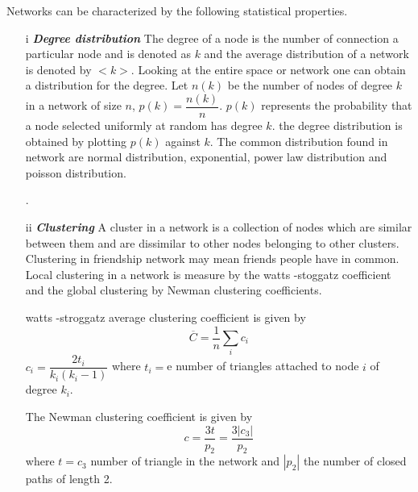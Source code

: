  Networks can be characterized by the following statistical properties.
 \begin{itemize}
 \item[i] \textit{\textbf{Degree distribution}}
   The degree of a node is the number of connection a particular node  and is denoted as $k$  and the average distribution of a network is denoted by $<k>$.
   Looking at the entire space or network one can obtain a distribution for the degree. Let $n(k)$ be the number of nodes of degree $k$  in a network of size $n$, $p(k) = \dfrac{n(k)}{n}$. $p(k)$ represents the probability that a node selected uniformly at random  has degree $k$. the degree distribution is obtained by plotting $p(k)$ against $k$\citep{estrada2015first}. The common distribution found in network are normal distribution, exponential, power law distribution and poisson distribution.
 
   \citep{chung2002average}.
 \item[ii] \textit{\textbf{Clustering }}
 A cluster in a network  is a collection of nodes which are similar between them and are dissimilar to other nodes belonging to other clusters. Clustering in friendship network may mean friends people have in common. Local clustering in a network is measure by   the watts -stoggatz  coefficient and the global clustering by  Newman clustering coefficients.
 
 watts -stroggatz average clustering coefficient is given by 
 \begin{equation}
 \overline{C} = \dfrac{1}{n} \sum_i c_i
 \end{equation}
 $c_i = \dfrac{2t_i}{k_i(k_i-1)}$ where $t_i =$e number of triangles attached to node $i$ of degree $k_i$.
 
 The Newman clustering coefficient is given by
 \begin{equation}
 c = \frac{3t}{p_2} =\dfrac{3|c_3|}{p_2}
 \end{equation}
 where $t = c_3$ number of triangle in the network and $|p_2|$ the number of closed paths of length 2. 
\end{itemize}
